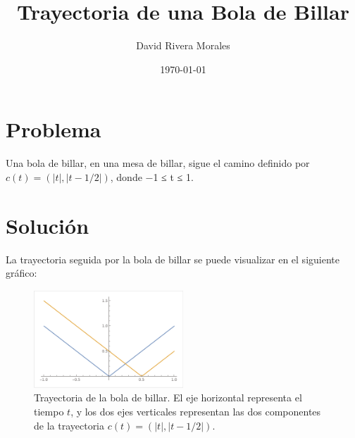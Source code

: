 \documentclass{article}
\begin{document}
\title{Trayectoria de una Bola de Billar}
\author{David Rivera Morales}
\date{\today}

\maketitle

\section{Problema}
Una bola de billar, en una mesa de billar, sigue el camino definido por \(c(t) = (|t|, |t−1/2|)\), donde −1 ≤ t ≤ 1. 

\section{Solución}
La trayectoria seguida por la bola de billar se puede visualizar en el siguiente gráfico:

\begin{figure}[h]
\centering
\includegraphics[width=0.5\textwidth]{image.png}
\caption{Trayectoria de la bola de billar. El eje horizontal representa el tiempo \( t \), y los dos ejes verticales representan las dos componentes de la trayectoria \( c(t) = (|t|, |t−1/2|) \).}
\end{figure}
\end{document}
